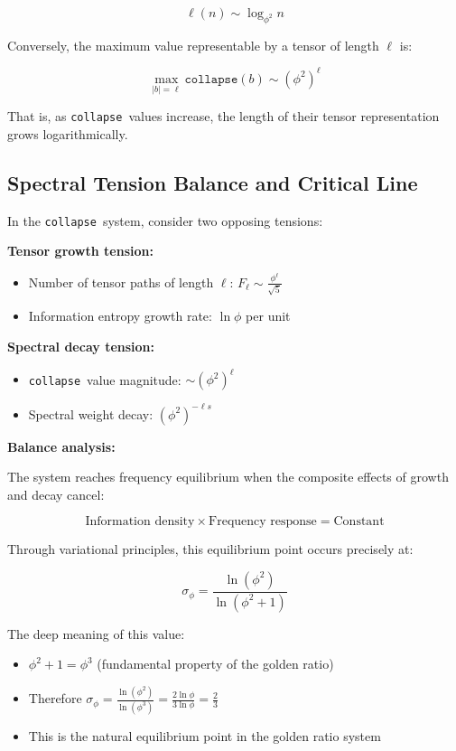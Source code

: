 \documentclass[12pt,a4paper]{article}
\theoremstyle{plain}
\theoremstyle{definition}
\theoremstyle{remark}
\newcommand{\collapse}{\texttt{collapse}}
\begin{document}
\begin{equation}
\ell(n) \sim \log_{\phi^2} n
\end{equation}

Conversely, the maximum value representable by a tensor of length $\ell$ is:

\begin{equation}
\max_{|b|=\ell} \collapse(b) \sim (\phi^2)^\ell
\end{equation}

That is, as \collapse\ values increase, the length of their tensor representation grows logarithmically.

\subsection{Spectral Tension Balance and Critical Line}

In the \collapse\ system, consider two opposing tensions:

\textbf{Tensor growth tension:}
\begin{itemize}
\item Number of tensor paths of length $\ell$: $F_\ell \sim \frac{\phi^\ell}{\sqrt{5}}$
\item Information entropy growth rate: $\ln \phi$ per unit
\end{itemize}

\textbf{Spectral decay tension:}
\begin{itemize}
\item \collapse\ value magnitude: $\sim (\phi^2)^\ell$
\item Spectral weight decay: $(\phi^2)^{-\ell s}$
\end{itemize}

\textbf{Balance analysis:}

The system reaches frequency equilibrium when the composite effects of growth and decay cancel:

\begin{equation}
\text{Information density} \times \text{Frequency response} = \text{Constant}
\end{equation}

Through variational principles, this equilibrium point occurs precisely at:

\begin{equation}
\boxed{
\sigma_\phi = \frac{\ln(\phi^2)}{\ln(\phi^2 + 1)}
}
\end{equation}

The deep meaning of this value:
\begin{itemize}
\item $\phi^2 + 1 = \phi^3$ (fundamental property of the golden ratio)
\item Therefore $\sigma_\phi = \frac{\ln(\phi^2)}{\ln(\phi^3)} = \frac{2\ln \phi}{3\ln \phi} = \frac{2}{3}$
\item This is the natural equilibrium point in the golden ratio system
\end{itemize}
\end{document}
